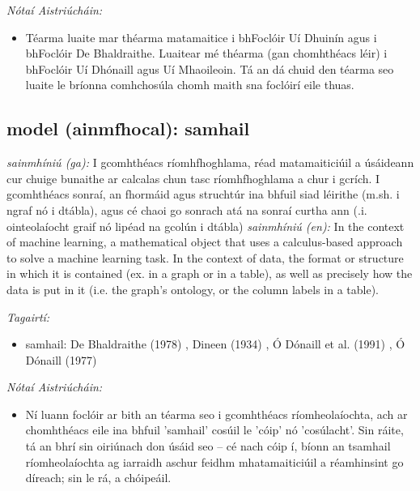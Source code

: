 \documentclass{article}
\begin{document}
 \noindent \textit{Nótaí Aistriúcháin:}
\begin{itemize}
	\item Téarma luaite mar théarma matamaitice i bhFoclóir Uí Dhuinín agus i bhFoclóir De Bhaldraithe. Luaitear mé théarma (gan chomhthéacs léir) i bhFoclóir Uí Dhónaill agus Uí Mhaoileoin. Tá an dá chuid den téarma seo luaite le bríonna comhchosúla chomh maith sna foclóirí eile thuas.
\end{itemize}


\subsection*{model (ainmfhocal): samhail} 
 \noindent \textit{sainmhíniú (ga):} I gcomhthéacs ríomhfhoghlama, réad matamaiticiúil a úsáideann cur chuige bunaithe ar calcalas chun tasc ríomhfhoghlama a chur i gcrích. I gcomhthéacs sonraí, an fhormáid agus struchtúr ina bhfuil siad léirithe (m.sh. i ngraf nó i dtábla), agus cé chaoi go sonrach atá na sonraí curtha ann (.i. ointeolaíocht graif nó lipéad na gcolún i dtábla)
\newline\newline
 \noindent \textit{sainmhíniú (en):} In the context of machine learning, a mathematical object that uses a calculus-based approach to solve a machine learning task. In the context of data, the format or structure in which it is contained (ex. in a graph or in a table), as well as precisely how the data is put in it (i.e. the graph's ontology, or the column labels in a table).
\newline

 \noindent \textit{Tagairtí:}
\begin{itemize}
	\item samhail: De Bhaldraithe (1978) \cite{de-bhaldraithe}, Dineen (1934) \cite{dineen}, Ó Dónaill et al. (1991) \cite{focloir-beag}, Ó Dónaill (1977) \cite{odonaill}
\end{itemize}

 \noindent \textit{Nótaí Aistriúcháin:}
\begin{itemize}
	\item Ní luann foclóir ar bith an téarma seo i gcomhthéacs ríomheolaíochta, ach ar chomhthéacs eile ina bhfuil 'samhail' cosúil le 'cóip' nó 'cosúlacht'. Sin ráite, tá an bhrí sin oiriúnach don úsáid seo -- cé nach cóip í, bíonn an tsamhail ríomheolaíochta ag iarraidh aschur feidhm mhatamaiticiúil a réamhinsint go díreach; sin le rá, a chóipeáil.
\end{itemize}
\end{document}
